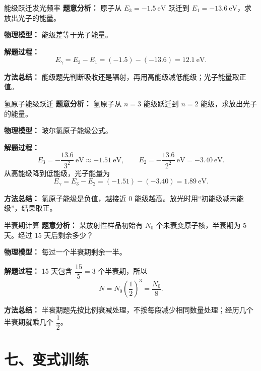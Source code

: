 \begin{examplebox}{能级跃迁发光频率}
\textbf{题意分析：} 原子从 $E_3=-1.5\ \mathrm{eV}$ 跃迁到 $E_1=-13.6\ \mathrm{eV}$，求放出光子的能量。

\textbf{物理模型：} 能级差等于光子能量。

\begin{center}

\end{center}

\textbf{解题过程：}
\[
E_{\gamma}=E_3-E_1=(-1.5)-(-13.6)=12.1\ \mathrm{eV}.
\]

\textbf{方法总结：} 能级题先判断吸收还是辐射，再用高能级减低能级；光子能量取正值。
\end{examplebox}

\begin{examplebox}{氢原子能级跃迁}
\textbf{题意分析：} 氢原子从 $n=3$ 能级跃迁到 $n=2$ 能级，求放出光子的能量。

\textbf{物理模型：} 玻尔氢原子能级公式。

\textbf{解题过程：}
\[
E_3=-\frac{13.6}{3^2}\ \mathrm{eV}\approx-1.51\ \mathrm{eV},
\qquad
E_2=-\frac{13.6}{2^2}\ \mathrm{eV}=-3.40\ \mathrm{eV}.
\]
从高能级降到低能级，光子能量为
\[
E_{\gamma}=E_3-E_2=(-1.51)-(-3.40)=1.89\ \mathrm{eV}.
\]

\textbf{方法总结：} 氢原子能级是负值，越接近 $0$ 能级越高。放光时用“初能级减末能级”，结果取正。
\end{examplebox}

\begin{examplebox}{半衰期计算}
\textbf{题意分析：} 某放射性样品初始有 $N_0$ 个未衰变原子核，半衰期为 5 天。经过 15 天后剩余多少？

\textbf{物理模型：} 每过一个半衰期剩余一半。

\begin{center}

\end{center}

\textbf{解题过程：}
15 天包含 $\dfrac{15}{5}=3$ 个半衰期，所以
\[
N=N_0\left(\frac12\right)^3=\frac{N_0}{8}.
\]

\textbf{方法总结：} 半衰期题先按比例衰减处理，不按每段减少相同数量处理；经历几个半衰期就乘几个 $\dfrac12$。
\end{examplebox}

\section*{七、变式训练}

